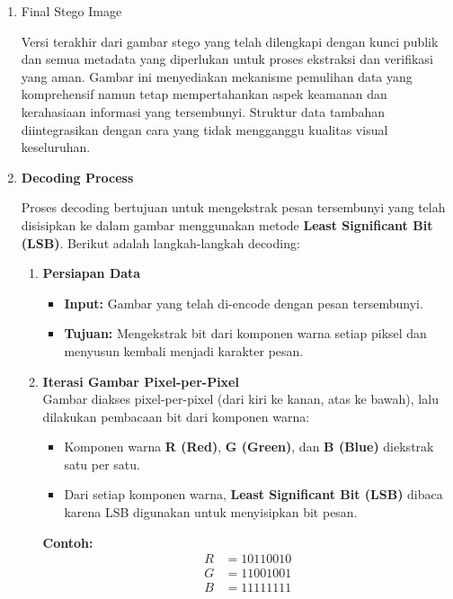 \documentclass{ittelkom}
\begin{document}
\begin{enumerate}
    \item Final Stego Image

          Versi terakhir dari gambar stego yang telah dilengkapi dengan kunci publik dan
          semua metadata yang diperlukan untuk proses ekstraksi dan verifikasi yang aman.
          Gambar ini menyediakan mekanisme pemulihan data yang komprehensif namun tetap
          mempertahankan aspek keamanan dan kerahasiaan informasi yang tersembunyi.
          Struktur data tambahan diintegrasikan dengan cara yang tidak mengganggu
          kualitas visual keseluruhan.
    \item \textbf{Decoding Process}

          Proses decoding bertujuan untuk mengekstrak pesan tersembunyi yang telah
          disisipkan ke dalam gambar menggunakan metode \textbf{Least Significant Bit
              (LSB)}. Berikut adalah langkah-langkah decoding:

          \begin{enumerate}
              \item \textbf{Persiapan Data}
                    \begin{itemize}
                        \item \textbf{Input:} Gambar yang telah di-encode dengan pesan tersembunyi.
                        \item \textbf{Tujuan:} Mengekstrak bit dari komponen warna setiap piksel dan menyusun kembali menjadi karakter pesan.
                    \end{itemize}

              \item \textbf{Iterasi Gambar Pixel-per-Pixel} \\
                    Gambar diakses pixel-per-pixel (dari kiri ke kanan, atas ke bawah), lalu dilakukan pembacaan bit dari komponen warna:
                    \begin{itemize}
                        \item Komponen warna \textbf{R (Red)}, \textbf{G (Green)}, dan \textbf{B (Blue)}
                              diekstrak satu per satu.
                        \item Dari setiap komponen warna, \textbf{Least Significant Bit (LSB)} dibaca karena
                              LSB digunakan untuk menyisipkan bit pesan.
                    \end{itemize}

                    \noindent
                    \textbf{Contoh:}
                    \[
                        \begin{array}{rl}
                            R & = 10110010 \\
                            G & = 11001001 \\
                            B & = 11111111
                        \end{array}
                    \]


\end{enumerate}
\end{enumerate}
\end{document}
